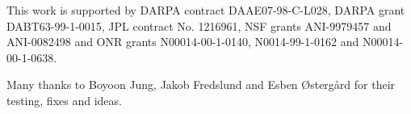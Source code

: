 \renewcommand{\baselinestretch}{0}
{\small
\begin{Acknowledgment}
\vspace*{-1.3em}
This work is supported by 
DARPA contract DAAE07-98-C-L028,
DARPA grant DABT63-99-1-0015,
JPL contract No. 1216961,
NSF grants ANI-9979457 and ANI-0082498 and
ONR grants N00014-00-1-0140, N0014-99-1-0162 and N00014-00-1-0638.

Many thanks to Boyoon Jung, Jakob Fredslund and 
Esben \O{}sterg\aa{}rd for their testing, fixes and ideas.

%
\end{Acknowledgment}


\vspace{-2.7em}

}



